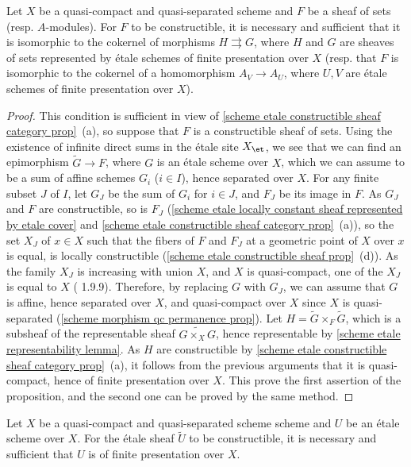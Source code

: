 \begin{proposition}\label{scheme qcqs etale constructible iff cokernel of represented}
Let $X$ be a quasi-compact and quasi-separated scheme and $F$ be a sheaf of sets (resp. $A$-modules). For $F$ to be constructible, it is necessary and sufficient that it is isomorphic to the cokernel of morphisms $H\rightrightarrows G$, where $H$ and $G$ are sheaves of sets represented by \'etale schemes of finite presentation over $X$ (resp. that $F$ is isomorphic to the cokernel of a homomorphism $A_{V}\to A_{U}$, where $U,V$ are \'etale schemes of finite presentation over $X$).
\end{proposition}
\begin{proof}
This condition is sufficient in view of \cref{scheme etale constructible sheaf category prop}~(a), so suppose that $F$ is a constructible sheaf of sets. Using the existence of infinite direct sums in the \'etale site $X_\et$, we see that we can find an epimorphism $\widetilde{G}\to F$, where $G$ is an \'etale scheme over $X$, which we can assume to be a sum of affine schemes $G_i$ ($i\in I$), hence separated over $X$. For any finite subset $J$ of $I$, let $G_J$ be the sum of $G_i$ for $i\in J$, and $F_J$ be its image in $F$. As $G_J$ and $F$ are constructible, so is $F_J$ (\cref{scheme etale locally constant sheaf represented by etale cover} and \cref{scheme etale constructible sheaf category prop}~(a)), so the set $X_J$ of $x\in X$ such that the fibers of $F$ and $F_J$ at a geometric point of $X$ over $x$ is equal, is locally constructible (\cref{scheme etale constructible sheaf prop}~(d)). As the family $X_J$ is increasing with union $X$, and $X$ is quasi-compact, one of the $X_J$ is equal to $X$ (\cite{EGA4-1} 1.9.9). Therefore, by replacing $G$ with $G_J$, we can assume that $G$ is affine, hence separated over $X$, and quasi-compact over $X$ since $X$ is quasi-separated (\cref{scheme morphism qc permanence prop}). Let $H=\widetilde{G}\times_F\widetilde{G}$, which is a subsheaf of the representable sheaf $\widetilde{G\times_XG}$, hence representable by \cref{scheme etale representability lemma}. As $H$ are constructible by \cref{scheme etale constructible sheaf category prop}~(a), it follows from the previous arguments that it is quasi-compact, hence of finite presentation over $X$. This prove the first assertion of the proposition, and the second one can be proved by the same method.
\end{proof}

\begin{corollary}\label{scheme qcqs etale represented constructible iff fp}
Let $X$ be a quasi-compact and quasi-separated scheme scheme and $U$ be an \'etale scheme over $X$. For the \'etale sheaf $\widetilde{U}$ to be constructible, it is necessary and sufficient that $U$ is of finite presentation over $X$.
\end{corollary}

